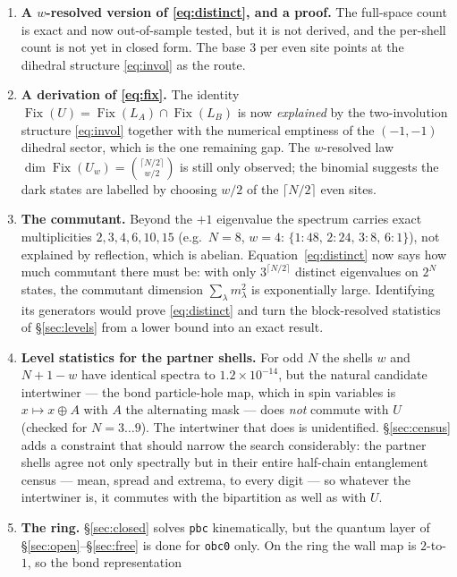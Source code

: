 \documentclass[11pt]{article}
\newcommand{\rt}[1]{\texttt{#1}}
\newcommand{\Fix}{\operatorname{Fix}}
\theoremstyle{plain}
\theoremstyle{definition}
\begin{document}
\begin{enumerate}
\item \textbf{A $w$-resolved version of \eqref{eq:distinct}, and a proof.} The
  full-space count is exact and now out-of-sample tested, but it is not derived,
  and the per-shell count is not yet in closed form. The base $3$ per even site
  points at the dihedral structure \eqref{eq:invol} as the route.
\item \textbf{A derivation of \eqref{eq:fix}.} The identity
  $\Fix(U)=\Fix(L_A)\cap\Fix(L_B)$ is now \emph{explained} by the two-involution
  structure \eqref{eq:invol} together with the numerical emptiness of the
  $(-1,-1)$ dihedral sector, which is the one remaining gap. The $w$-resolved law
  $\dim\Fix(U_w)=\binom{\lceil N/2\rceil}{w/2}$ is still only observed; the
  binomial suggests the dark states are labelled by choosing $w/2$ of the
  $\lceil N/2\rceil$ even sites.
\item \label{it:commutant}\textbf{The commutant.} Beyond the $+1$ eigenvalue the
  spectrum carries exact multiplicities $2,3,4,6,10,15$ (e.g.\ $N=8$, $w=4$:
  $\{1{:}48,\,2{:}24,\,3{:}8,\,6{:}1\}$), not explained by reflection, which is
  abelian. Equation~\eqref{eq:distinct} now says how much commutant there must
  be: with only $3^{\lceil N/2\rceil}$ distinct eigenvalues on $2^N$ states, the
  commutant dimension $\sum_\lambda m_\lambda^2$ is exponentially large.
  Identifying its generators would prove \eqref{eq:distinct} and turn the
  block-resolved statistics of \S\ref{sec:levels} from a lower bound into an
  exact result.
\item \label{it:partner}\textbf{Level statistics for the partner shells.} For
  odd $N$ the shells $w$ and $N+1-w$ have identical spectra to
  $1.2\times10^{-14}$, but the natural candidate intertwiner --- the bond
  particle-hole map, which in spin variables is $x\mapsto x\oplus A$ with $A$ the
  alternating mask --- does \emph{not} commute with $U$ (checked for
  $N=3\ldots9$). The intertwiner that does is unidentified. \S\ref{sec:census}
  adds a constraint that should narrow the search considerably: the partner
  shells agree not only spectrally but in their entire half-chain entanglement
  census --- mean, spread and extrema, to every digit --- so whatever the
  intertwiner is, it commutes with the bipartition as well as with $U$.
\item \textbf{The ring.} \S\ref{sec:closed} solves \rt{pbc} kinematically, but
  the quantum layer of \S\ref{sec:open}--\S\ref{sec:free} is done for \rt{obc0}
  only. On the ring the wall map is $2$-to-$1$, so the bond representation

\end{enumerate}
\end{document}
